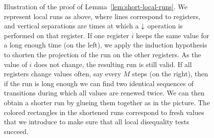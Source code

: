 \begin{figure}
	
	\caption{Illustration of the proof of Lemma~\ref{lem:short-local-runs}. We represent local runs as above, where lines correspond to registers, and vertical separations are times at which a $\downarrow$ operation is performed on that register. If one register $i$ keeps the same value for a long enough time (on the left), we apply the induction hypothesis to shorten the projection of the run on the other registers. As the value of $i$ does not change, the resulting run is still valid. If all registers change values often, say every $M$ steps (on the right), then if the run is long enough we can find two identical sequences of transitions during which all values are renewed twice. We can then obtain a shorter run by glueing them together as in the picture. The colored rectangles in the shortened runs correspond to fresh values that we introduce to make sure that all local disequality tests succeed.}
	\label{fig:pumping}
\end{figure}

